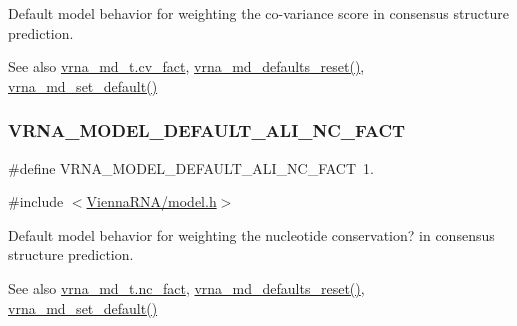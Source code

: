 Default model behavior for weighting the co-\/variance score in consensus structure prediction. 

\begin{DoxySeeAlso}{See also}
\hyperlink{group__model__details_a62ebefb9d0643e5c4c8a2ec84a105ce6}{vrna\+\_\+md\+\_\+t.\+cv\+\_\+fact}, \hyperlink{group__model__details_ga70834424cf804d149937de89f80ceb45}{vrna\+\_\+md\+\_\+defaults\+\_\+reset()}, \hyperlink{group__model__details_ga8ac6ff84936282436f822644bf841f66}{vrna\+\_\+md\+\_\+set\+\_\+default()} 
\end{DoxySeeAlso}
\mbox{\label{group__model__details_ga8f774daaafec28160c1ca5d09f2cbdba}} 
\subsubsection{\texorpdfstring{V\+R\+N\+A\+\_\+\+M\+O\+D\+E\+L\+\_\+\+D\+E\+F\+A\+U\+L\+T\+\_\+\+A\+L\+I\+\_\+\+N\+C\+\_\+\+F\+A\+CT}{VRNA\_MODEL\_DEFAULT\_ALI\_NC\_FACT}}
{\footnotesize\ttfamily \#define V\+R\+N\+A\+\_\+\+M\+O\+D\+E\+L\+\_\+\+D\+E\+F\+A\+U\+L\+T\+\_\+\+A\+L\+I\+\_\+\+N\+C\+\_\+\+F\+A\+CT~1.}



{\ttfamily \#include $<$\hyperlink{model_8h}{Vienna\+R\+N\+A/model.\+h}$>$}



Default model behavior for weighting the nucleotide conservation? in consensus structure prediction. 

\begin{DoxySeeAlso}{See also}
\hyperlink{group__model__details_abcf568e6124bfcb2f847ff4eb0dfded6}{vrna\+\_\+md\+\_\+t.\+nc\+\_\+fact}, \hyperlink{group__model__details_ga70834424cf804d149937de89f80ceb45}{vrna\+\_\+md\+\_\+defaults\+\_\+reset()}, \hyperlink{group__model__details_ga8ac6ff84936282436f822644bf841f66}{vrna\+\_\+md\+\_\+set\+\_\+default()} 
\end{DoxySeeAlso}


